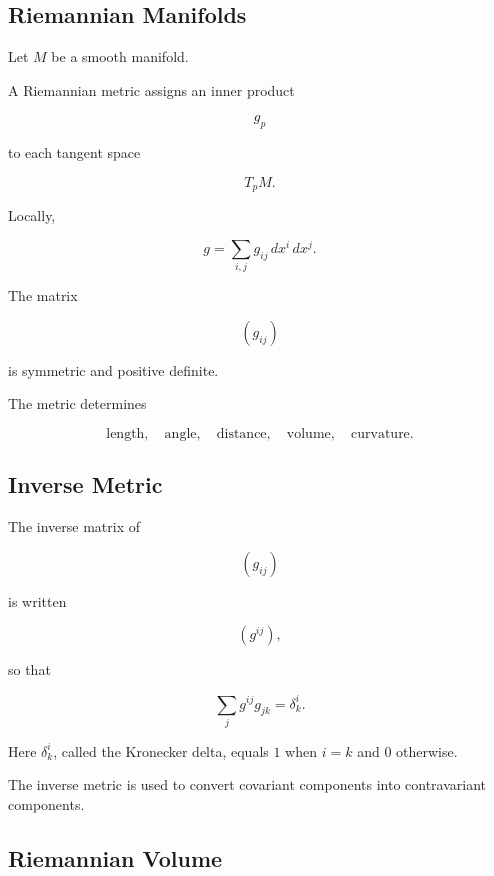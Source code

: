 \subsection{Riemannian Manifolds}
\label{subsec:geometric-analysis-riemannian-manifolds}

Let \(M\) be a smooth manifold.

A Riemannian metric assigns an inner product

\[
g_p
\]

to each tangent space

\[
T_pM.
\]

Locally,

\[
\boxed{
g
=
\sum_{i,j}
g_{ij}\,dx^i\,dx^j.
}
\]

The matrix

\[
(g_{ij})
\]

is symmetric and positive definite.

The metric determines

\[
\boxed{
\text{length},
\quad
\text{angle},
\quad
\text{distance},
\quad
\text{volume},
\quad
\text{curvature}.
}
\]

\subsection{Inverse Metric}
\label{subsec:inverse-metric}

The inverse matrix of

\[
(g_{ij})
\]

is written

\[
(g^{ij}),
\]

so that

\[
\boxed{
\sum_j
g^{ij}g_{jk}
=
\delta^i_k.
}
\]

Here \(\delta^i_k\), called the Kronecker delta, equals \(1\) when
\(i=k\) and \(0\) otherwise.

The inverse metric is used to convert covariant components into
contravariant components.

\subsection{Riemannian Volume}
\label{subsec:riemannian-volume}

